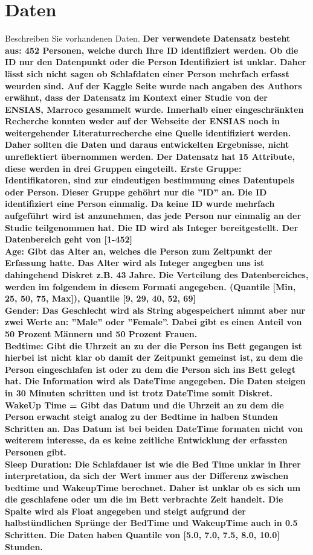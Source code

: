 \documentclass[usegeometry=true]{scrartcl}
\begin{document}
\section{Daten}
Beschreiben Sie vorhandenen Daten. 
\textbf{Der verwendete Datensatz besteht aus: 452 Personen, welche durch Ihre ID identifiziert werden. Ob die ID nur den Datenpunkt oder die Person Identifiziert ist unklar. Daher lässt sich nicht sagen ob Schlafdaten einer Person mehrfach erfasst weurden sind. 
Auf der Kaggle Seite wurde nach angaben des Authors erwähnt, dass der Datensatz im Kontext einer Studie von der ENSIAS, Marroco gesammelt wurde.
Innerhalb einer eingeschränkten Recherche konnten weder auf der Webseite der ENSIAS noch in weitergehender Literaturrecherche eine Quelle identifiziert werden. Daher sollten die Daten und daraus entwickelten Ergebnisse, nicht unreflektiert übernommen werden. 
Der Datensatz hat 15 Attribute, diese werden in drei Gruppen eingeteilt. Erste Gruppe: Identifikatoren, sind zur eindeutigen bestimmung eines Datentupels oder Person. Dieser Gruppe gehöhrt nur die ''ID'' an.
Die ID identifiziert eine Person einmalig. Da keine ID wurde mehrfach aufgeführt wird ist anzunehmen, das jede Person nur einmalig an der Studie teilgenommen hat. Die ID wird als Integer bereitgestellt. Der Datenbereich geht von [1-452]
\\ Age: Gibt das Alter an, welches die Person zum Zeitpunkt der Erfassung hatte. Das Alter wird als Integer angegben uns ist dahingehend Diskret z.B. 43 Jahre. Die Verteilung des Datenbereiches, werden im folgendem in diesem Formati angegeben. (Quantile [Min, 25, 50, 75, Max]), Quantile [9, 29, 40, 52, 69]
\\ Gender: Das Geschlecht wird als String abgespeichert nimmt aber nur zwei Werte an: ''Male'' oder ''Female''. Dabei gibt es einen  Anteil von 50 Prozent Männern und 50 Prozent Frauen. 
\\ Bedtime: Gibt die Uhrzeit an zu der die Person ins Bett gegangen ist hierbei ist nicht klar ob damit der Zeitpunkt gemeinst ist, zu dem die Person eingeschlafen ist oder zu dem die Person sich ins Bett gelegt hat.
 Die Information wird als DateTime angegeben. Die Daten steigen in 30 Minuten schritten und ist trotz DateTime somit Diskret. 
\\ WakeUp Time = Gibt das Datum und die Uhrzeit an zu dem die Person erwacht steigt analog zu der Bedtime in halben Stunden Schritten an. Das Datum ist bei beiden DateTime formaten nicht von weiterem interesse, da es keine zeitliche Entwicklung der erfassten Personen gibt. 
\\ Sleep Duration: Die Schlafdauer ist wie die Bed Time unklar in Ihrer interpretation, da sich der Wert immer aus der Differenz zwischen bedtime und WakeupTime berechnet. Daher ist unklar ob es sich um die geschlafene oder um die im Bett verbrachte Zeit handelt. Die Spalte wird als Float angegeben und steigt aufgrund der halbstündlichen Sprünge der BedTime und WakeupTime auch in 0.5 Schritten. Die Daten haben Quantile von [5.0, 7.0, 7.5, 8.0, 10.0] Stunden.
}
\end{document}
